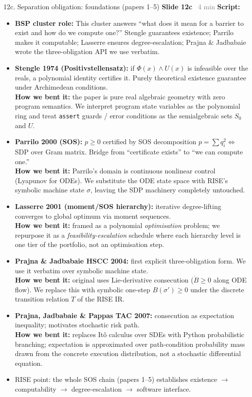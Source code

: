 \documentclass[aspectratio=169]{beamer}
\newcommand{\syncline}[2]{\textbf{#1} \hfill \textcolor{gray}{#2}}
\begin{document}
\begin{frame}[shrink=62]{12c. Separation obligation: foundations (papers 1--5)}
\syncline{Slide 12c}{~4 min}
\textbf{Script:}
\begin{itemize}
  \item \textbf{BSP cluster role:} This cluster answers ``what does it mean for a barrier to exist and how do we compute one?'' Stengle guarantees existence; Parrilo makes it computable; Lasserre ensures degree-escalation; Prajna \& Jadbabaie wrote the three-obligation API we use verbatim.
  \item \textbf{Stengle 1974 (Positivstellensatz):} if \(\Phi(x)\wedge U(x)\) is infeasible over the reals, a polynomial identity certifies it. Purely theoretical existence guarantee under Archimedean conditions.\\
    \textbf{How we bent it:} the paper is pure real algebraic geometry with zero program semantics. We interpret program state variables as the polynomial ring and treat \texttt{assert} guards / error conditions as the semialgebraic sets \(S_0\) and \(U\).
  \item \textbf{Parrilo 2000 (SOS):} \(p\ge0\) certified by SOS decomposition \(p=\sum q_i^2\Leftrightarrow\) SDP over Gram matrix. Bridge from ``certificate exists'' to ``we can compute one.''\\
    \textbf{How we bent it:} Parrilo's domain is continuous nonlinear control (Lyapunov for ODEs). We substitute the ODE state space with RISE's symbolic machine state \(\sigma\), leaving the SDP machinery completely untouched.
  \item \textbf{Lasserre 2001 (moment/SOS hierarchy):} iterative degree-lifting converges to global optimum via moment sequences.\\
    \textbf{How we bent it:} framed as a polynomial \emph{optimisation} problem; we repurpose it as a \emph{feasibility-escalation} schedule where each hierarchy level is one tier of the portfolio, not an optimisation step.
  \item \textbf{Prajna \& Jadbabaie HSCC 2004:} first explicit three-obligation form. We use it verbatim over symbolic machine state.\\
    \textbf{How we bent it:} original uses Lie-derivative consecution (\(\dot B\ge0\) along ODE flow). We replace this with symbolic one-step \(B(\sigma')\ge0\) under the discrete transition relation \(T\) of the RISE IR.
  \item \textbf{Prajna, Jadbabaie \& Pappas TAC 2007:} consecution as expectation inequality; motivates stochastic risk path.\\
    \textbf{How we bent it:} replaces It\^{o} calculus over SDEs with Python probabilistic branching; expectation is approximated over path-condition probability mass drawn from the concrete execution distribution, not a stochastic differential equation.
  \item RISE point: the whole SOS chain (papers 1--5) establishes existence \(\rightarrow\) computability \(\rightarrow\) degree-escalation \(\rightarrow\) software interface.
\end{itemize}
\end{frame}
\end{document}
